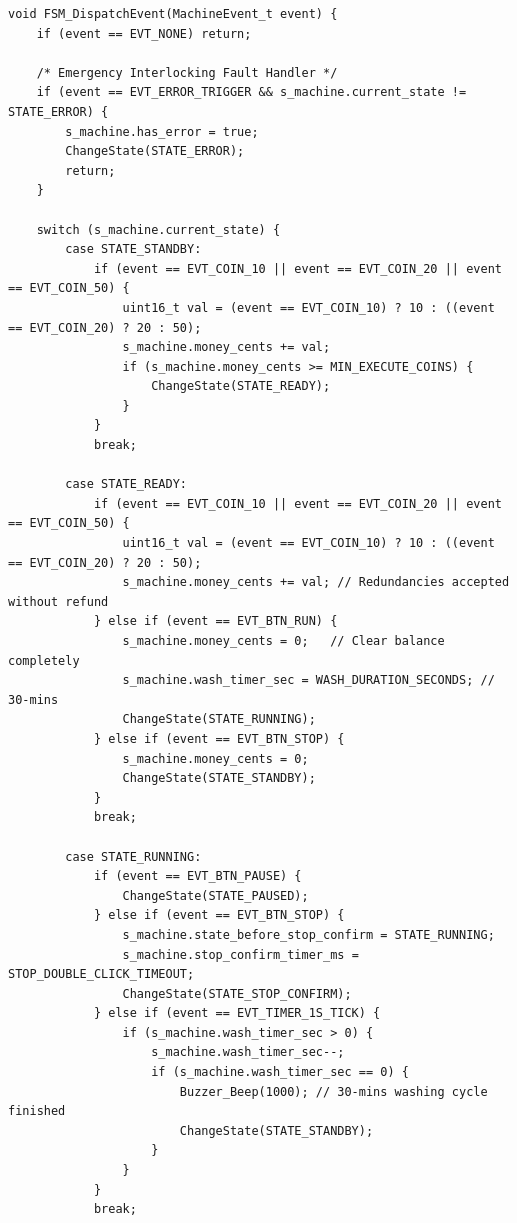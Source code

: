 \documentclass[12pt]{article}
\begin{document}
\begin{lstlisting}[caption={Core EFSM state evaluation engine implementing the Moore washing machine controller.}, label={lst:fsm_code}]
void FSM_DispatchEvent(MachineEvent_t event) {
    if (event == EVT_NONE) return;

    /* Emergency Interlocking Fault Handler */
    if (event == EVT_ERROR_TRIGGER && s_machine.current_state != STATE_ERROR) {
        s_machine.has_error = true;
        ChangeState(STATE_ERROR);
        return;
    }

    switch (s_machine.current_state) {
        case STATE_STANDBY:
            if (event == EVT_COIN_10 || event == EVT_COIN_20 || event == EVT_COIN_50) {
                uint16_t val = (event == EVT_COIN_10) ? 10 : ((event == EVT_COIN_20) ? 20 : 50);
                s_machine.money_cents += val;
                if (s_machine.money_cents >= MIN_EXECUTE_COINS) {
                    ChangeState(STATE_READY);
                }
            }
            break;

        case STATE_READY:
            if (event == EVT_COIN_10 || event == EVT_COIN_20 || event == EVT_COIN_50) {
                uint16_t val = (event == EVT_COIN_10) ? 10 : ((event == EVT_COIN_20) ? 20 : 50);
                s_machine.money_cents += val; // Redundancies accepted without refund
            } else if (event == EVT_BTN_RUN) {
                s_machine.money_cents = 0;   // Clear balance completely
                s_machine.wash_timer_sec = WASH_DURATION_SECONDS; // 30-mins
                ChangeState(STATE_RUNNING);
            } else if (event == EVT_BTN_STOP) {
                s_machine.money_cents = 0;
                ChangeState(STATE_STANDBY);
            }
            break;

        case STATE_RUNNING:
            if (event == EVT_BTN_PAUSE) {
                ChangeState(STATE_PAUSED);
            } else if (event == EVT_BTN_STOP) {
                s_machine.state_before_stop_confirm = STATE_RUNNING;
                s_machine.stop_confirm_timer_ms = STOP_DOUBLE_CLICK_TIMEOUT;
                ChangeState(STATE_STOP_CONFIRM);
            } else if (event == EVT_TIMER_1S_TICK) {
                if (s_machine.wash_timer_sec > 0) {
                    s_machine.wash_timer_sec--;
                    if (s_machine.wash_timer_sec == 0) {
                        Buzzer_Beep(1000); // 30-mins washing cycle finished
                        ChangeState(STATE_STANDBY);
                    }
                }
            }
            break;


\end{lstlisting}
\end{document}
